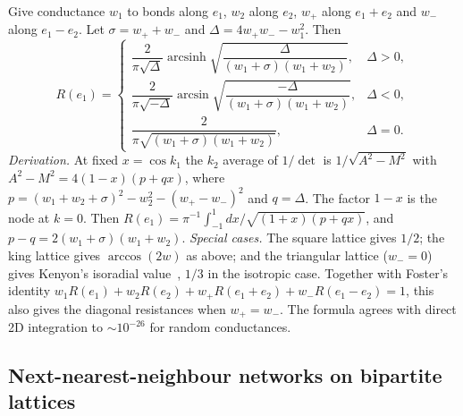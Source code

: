 \documentclass[aps,pre,10pt,twocolumn,superscriptaddress,nofootinbib]{revtex4-2}
\newcommand{\arcsinh}{\operatorname{arcsinh}}
\begin{document}
Give conductance $w_1$ to bonds along $e_1$, $w_2$ along $e_2$, $w_+$ along $e_1+e_2$ and $w_-$ along
$e_1-e_2$. Let $\sigma=w_++w_-$ and $\Delta=4w_+w_--w_1^2$. Then
\begin{equation}
R(e_1)=\begin{cases}
\dfrac{2}{\pi\sqrt\Delta}\arcsinh\sqrt{\dfrac{\Delta}{(w_1+\sigma)(w_1+w_2)}}, & \Delta>0,\\[2ex]
\dfrac{2}{\pi\sqrt{-\Delta}}\arcsin\sqrt{\dfrac{-\Delta}{(w_1+\sigma)(w_1+w_2)}}, & \Delta<0,\\[2ex]
\dfrac{2}{\pi\sqrt{(w_1+\sigma)(w_1+w_2)}}, & \Delta=0 .
\end{cases}
\end{equation}
\emph{Derivation.} At fixed $x=\cos k_1$ the $k_2$ average of $1/\det$ is $1/\sqrt{A^2-M^2}$ with
$A^2-M^2=4(1-x)(p+qx)$, where $p=(w_1+w_2+\sigma)^2-w_2^2-(w_+-w_-)^2$ and $q=\Delta$. The factor $1-x$ is
the node at $k=0$. Then $R(e_1)=\pi^{-1}\int_{-1}^1dx/\sqrt{(1+x)(p+qx)}$, and $p-q=2(w_1+\sigma)(w_1+w_2)$.
\emph{Special cases.} The square lattice gives $1/2$; the king lattice gives $\arccos(2w)$ as above; and the
triangular lattice ($w_-=0$) gives Kenyon's isoradial value~\cite{Kenyon2002}, $1/3$ in the isotropic case.
Together with Foster's identity $w_1R(e_1)+w_2R(e_2)+w_+R(e_1+e_2)+w_-R(e_1-e_2)=1$, this also gives the
diagonal resistances when $w_+=w_-$. The formula agrees with direct 2D integration to $\sim10^{-26}$
for random conductances.

\subsection{Next-nearest-neighbour networks on bipartite lattices}
\end{document}
